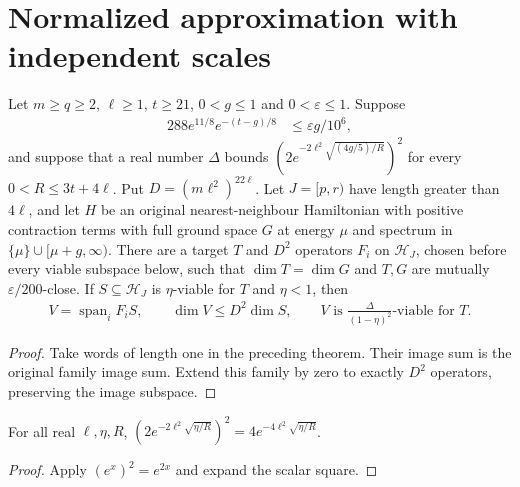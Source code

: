 \section{Normalized approximation with independent scales}

\begin{lemma}
    \label{thm:independent_long_middle_actual_dg_family}
    \leanok
    Let $m\ge q\ge2$, $\ell\ge1$, $t\ge21$, $0<g\le1$ and $0<\varepsilon\le1$.
    Suppose
    \begin{align}
        288e^{11/8}e^{-(t-g)/8} & \le\varepsilon g/10^6,
        \label{eq:independent_family_tail}
    \end{align}
    and suppose that a real number $\Delta$ bounds
    $(2e^{-2\ell^2\sqrt{(4g/5)/R}})^2$ for every $0<R\le3t+4\ell$.
    Put $D=(m\ell^2)^{22\ell}$.
    Let $J=[p,r)$ have length greater than $4\ell$, and let $H$ be an
    original nearest-neighbour Hamiltonian with positive contraction terms with full ground
    space $G$ at energy $\mu$ and spectrum in $\{\mu\}\cup[\mu+g,\infty)$.
    There are a target $T$ and $D^2$ operators $F_i$ on $\mathcal H_J$,
    chosen before every viable subspace below, such that $\dim T=\dim G$
    and $T,G$ are mutually $\varepsilon/200$-close.
    If $S\subseteq\mathcal H_J$ is $\eta$-viable for $T$ and $\eta<1$, then
    \begin{align}
        V=\operatorname{span}_i F_iS,
        \qquad \dim V\le D^2\dim S,
        \qquad V\text{ is }\frac{\Delta}{(1-\eta)^2}\text{-viable for }T.
        \label{eq:independent_family_improvement}
    \end{align}
\end{lemma}
\begin{proof}
    \leanok
    Take words of length one in the preceding theorem. Their image sum
    is the original family image sum. Extend this family by zero to
    exactly $D^2$ operators, preserving the image subspace.
\end{proof}

\begin{lemma}
    \label{thm:squared_chebyshev_error_eq}
    \leanok
    For all real $\ell,\eta,R$,
    $(2e^{-2\ell^2\sqrt{\eta/R}})^2=4e^{-4\ell^2\sqrt{\eta/R}}$.
\end{lemma}
\begin{proof}
    \leanok
    Apply $(e^x)^2=e^{2x}$ and expand the scalar square.
\end{proof}

